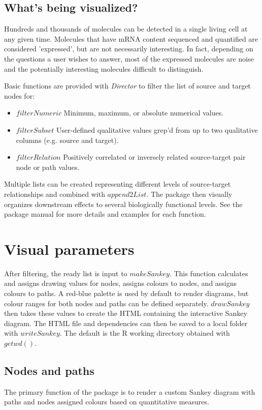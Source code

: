 \documentclass[a4paper]{article}
\begin{document}
\subsection{What's being visualized?}
Hundreds and thousands of molecules can be detected in a single living cell at any given time. Molecules that have mRNA content sequenced and quantified are considered 'expressed', but are not necessarily interesting. In fact, depending on the questions a user wishes to answer, most of the expressed molecules are noise and the potentially interesting molecules difficult to distinguish.

Basic functions are provided with \textit{Director} to filter the list of source and target nodes for:
\begin{itemize}
    \item $filterNumeric$ Minimum, maximum, or absolute numerical values.
    \item $filterSubset$ User-defined qualitative values grep'd from up to two qualitative columns (e.g. source and target).
    \item $filterRelation$ Positively correlated or inversely related source-target pair node or path values.
\end{itemize}
\noindent Multiple lists can be created representing different levels of source-target relationships and combined with $append2List$. The package then visually organizes downstream effects to several biologically functional levels. See the package manual for more details and examples for each function.

\section{Visual parameters}
After filtering, the ready list is input to $makeSankey$. This function calculates and assigns drawing values for nodes, assigns colours to nodes, and assigns colours to paths. A red-blue palette is used by default to render diagrams, but colour ranges for both nodes and paths can be defined separately. $drawSankey$  then takes these values to create the HTML containing the interactive Sankey diagram. The HTML file and dependencies can then be saved to a local folder with $writeSankey$. The default is the R working directory obtained with $getwd()$.

\subsection{Nodes and paths}
The primary function of the package is to render a custom Sankey diagram with paths and nodes assigned colours based on quantitative measures.
\end{document}
